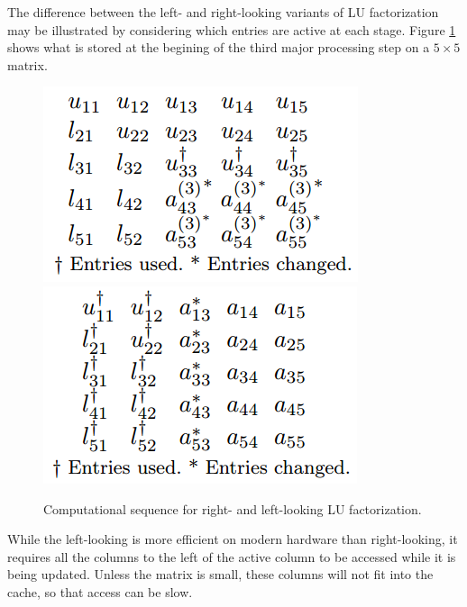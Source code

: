 \begin{exm}
    The difference between the left- and right-looking variants 
    of LU factorization may be illustrated by considering 
    which entries are active at each stage. Figure 
    \ref{fig::rightleftlooking} shows what is stored at the 
    begining of the third major processing step on a $5\times 5$ 
    matrix.
    \begin{figure}[H]
        \includegraphics[width=0.49\linewidth]{png/rightlooking.png}
        \hfill
        \includegraphics[width=0.49\linewidth]{png/leftlooking.png}
        \caption{Computational sequence for right- and 
        left-looking LU factorization.}
        \label{fig::rightleftlooking}
    \end{figure}

    While the left-looking is more efficient on modern hardware 
    than right-looking, it requires all the columns to the left 
    of the active column to be accessed while it is being 
    updated. Unless the matrix is small, these columns will not 
    fit into the cache, so that access can be slow.
\end{exm}

